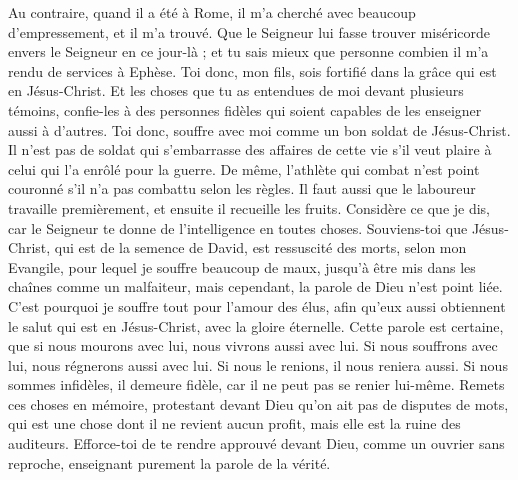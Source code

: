 \begin{multicols}{2}
Au contraire, quand il a été à Rome, il m'a cherché avec beaucoup d’empressement, et il m'a trouvé.
Que le Seigneur lui fasse trouver miséricorde envers le Seigneur en ce jour-là ; et tu sais mieux que personne combien il m'a rendu de services à Ephèse.
\VerseOne{}Toi donc, mon fils, sois fortifié dans la grâce qui est en Jésus-Christ.
Et les choses que tu as entendues de moi devant plusieurs témoins, confie-les à des personnes fidèles qui soient capables de les enseigner aussi à d'autres.
Toi donc, souffre avec moi comme un bon soldat de Jésus-Christ.
Il n’est pas de soldat qui s'embarrasse des affaires de cette vie s’il veut plaire à celui qui l'a enrôlé pour la guerre.
De même, l’athlète qui combat n'est point couronné s'il n'a pas combattu selon les règles.
Il faut aussi que le laboureur travaille premièrement, et ensuite il recueille les fruits.
Considère ce que je dis, car le Seigneur te donne de l’intelligence en toutes choses.
Souviens-toi que Jésus-Christ, qui est de la semence de David, est ressuscité des morts, selon mon Evangile,
pour lequel je souffre beaucoup de maux, jusqu'à être mis dans les chaînes comme un malfaiteur, mais cependant, la parole de Dieu n'est point liée.
C'est pourquoi je souffre tout pour l'amour des élus, afin qu'eux aussi obtiennent le salut qui est en Jésus-Christ, avec la gloire éternelle.
Cette parole est certaine, que si nous mourons avec lui, nous vivrons aussi avec lui.
Si nous souffrons avec lui, nous régnerons aussi avec lui. Si nous le renions, il nous reniera aussi.
Si nous sommes infidèles, il demeure fidèle, car il ne peut pas se renier lui-même.
Remets ces choses en mémoire, protestant devant Dieu qu'on ait pas de disputes de mots, qui est une chose dont il ne revient aucun profit, mais elle est la ruine des auditeurs.
Efforce-toi de te rendre approuvé devant Dieu, comme un ouvrier sans reproche, enseignant purement la parole de la vérité.

\end{multicols}
